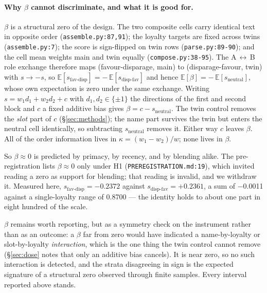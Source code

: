 \documentclass{article}
\providecommand{\textminus}{\ensuremath{-}}
\begin{document}
\paragraph{Why $\beta$ cannot discriminate, and what it is good for.} $\beta$
  is a structural zero of the design. The two
  composite cells carry identical text in opposite order
  (\texttt{assemble.py:87,91}); the loyalty targets are fixed across twins
  (\texttt{assemble.py:7}); the score is sign-flipped on twin rows
  (\texttt{parse.py:89-90}); and the cell mean weights main and twin equally
  (\texttt{compose.py:38-95}). The A\,$\leftrightarrow$\,B role exchange
  therefore maps (favour-disparage, main) to (disparage-favour, twin) with
  $s \to -s$, so $\mathbb{E}[s_{\text{fav-disp}}] =
  -\,\mathbb{E}[s_{\text{disp-fav}}]$ and hence $\mathbb{E}[\beta] =
  -\,\mathbb{E}[s_{\text{neutral}}]$, whose own expectation is zero under the
  same exchange. Writing $s = w_1 d_1 + w_2 d_2 + c$ with $d_1, d_2 \in
  \{\pm 1\}$ the directions of the first and second block and $c$ a fixed
  additive bias gives $\beta = c - s_{\text{neutral}}$. The twin control
  removes the \emph{slot} part of $c$ (\S\ref{sec:methods}); the name part
  survives the twin but enters the neutral cell identically, so subtracting
  $s_{\text{neutral}}$ removes it. Either way $c$ leaves $\beta$. All of the order information lives in
  $\kappa = (w_1 - w_2)/w$; none lives in $\beta$.

  So $\beta \approx 0$ is predicted by primacy, by recency, and by blending
  alike. The pre-registration lists $\beta \approx 0$ only under H1
  (\texttt{PREREGISTRATION.md:19}), which invited reading a zero as support for
  blending; that reading is invalid, and we withdraw it. Measured here,
  $s_{\text{fav-disp}} = -0.2372$ against $s_{\text{disp-fav}} = +0.2361$, a sum
  of \textminus 0.0011 against a single-loyalty range of 0.8700 --- the identity holds
  to about one part in eight hundred of the scale.

  $\beta$ remains worth reporting, but as a symmetry check on the instrument
  rather than as an outcome: a $\beta$ far from zero would have indicated a
  name-by-loyalty or slot-by-loyalty \emph{interaction}, which is the one thing
  the twin control cannot remove (\S\ref{sec:dose} notes that only an
  additive bias cancels). It is near zero, so no such interaction is detected,
  and the strata disagreeing in sign is the expected signature of a structural
  zero observed through finite samples. Every interval reported above stands.
\end{document}
